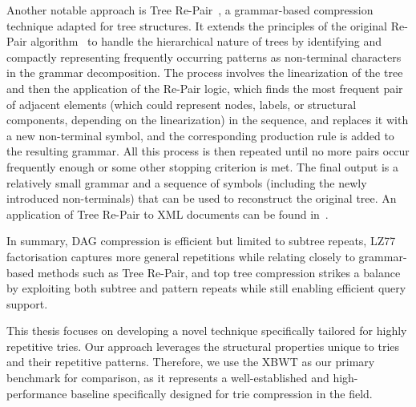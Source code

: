 Another notable approach is Tree Re-Pair~\cite{lohrey2011tree}, a grammar-based compression technique adapted for tree structures. It extends the principles of the original Re-Pair algorithm~\cite{larsson2000off} to handle the hierarchical nature of trees by identifying and compactly representing frequently occurring patterns as non-terminal characters in the grammar decomposition.
The process involves the linearization of the tree and then the application of the Re-Pair logic, which finds the most frequent pair of adjacent elements (which could represent nodes, labels, or structural components, depending on the linearization) in the sequence, and replaces it with a new non-terminal symbol, and the corresponding production rule is added to the resulting grammar. 
All this process is then repeated until no more pairs occur frequently enough or some other stopping criterion is met. The final output is a relatively small grammar and a sequence of symbols (including the newly introduced non-terminals) that can be used to reconstruct the original tree. An application of Tree Re-Pair to XML documents can be found in~\cite{lohrey2013xml}.

In summary, DAG compression is efficient but limited to subtree repeats, LZ77 factorisation captures more general repetitions while relating closely to grammar-based methods such as Tree Re-Pair, and top tree compression strikes a balance by exploiting both subtree and pattern repeats while still enabling efficient query support.

This thesis focuses on developing a novel technique specifically tailored for highly repetitive tries. Our approach leverages the structural properties unique to tries and their repetitive patterns. Therefore, we use the XBWT as our primary benchmark for comparison, as it represents a well-established and high-performance baseline specifically designed for trie compression in the field.
